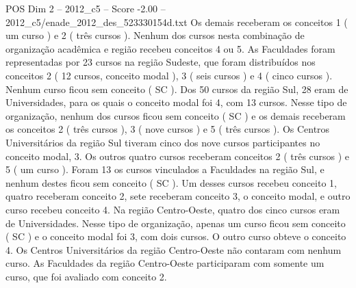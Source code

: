 \begin{textsample}{POS Dim 2 – 2012\_c5 – Score -2.00 – 2012\_c5/enade\_2012\_des\_523330154d.txt}
Os demais receberam os conceitos 1 ( um curso ) e 2 ( três cursos ).
Nenhum dos cursos nesta combinação de organização acadêmica e região recebeu conceitos 4 ou 5.
As Faculdades foram representadas por 23 cursos na região Sudeste, que foram distribuídos nos conceitos 2 ( 12 cursos, conceito modal ), 3 ( seis cursos ) e 4 ( cinco cursos ).
Nenhum curso ficou sem conceito ( SC ).
Dos 50 cursos da região Sul, 28 eram de Universidades, para os quais o conceito modal foi 4, com 13 cursos.
Nesse tipo de organização, nenhum dos cursos ficou sem conceito ( SC ) e os demais receberam os conceitos 2 ( três cursos ), 3 ( nove cursos ) e 5 ( três cursos ).
Os Centros Universitários da região Sul tiveram cinco dos nove cursos participantes no conceito modal, 3.
Os outros quatro cursos receberam conceitos 2 ( três cursos ) e 5 ( um curso ).
Foram 13 os cursos vinculados a Faculdades na região Sul, e nenhum destes ficou sem conceito ( SC ).
Um desses cursos recebeu conceito 1, quatro receberam conceito 2, sete receberam conceito 3, o conceito modal, e outro curso recebeu conceito 4.
Na região Centro-Oeste, quatro dos cinco cursos eram de Universidades.
Nesse tipo de organização, apenas um curso ficou sem conceito ( SC ) e o conceito modal foi 3, com dois cursos.
O outro curso obteve o conceito 4.
Os Centros Universitários da região Centro-Oeste não contaram com nenhum curso.
As Faculdades da região Centro-Oeste participaram com somente um curso, que foi avaliado com conceito 2.

\end{textsample}
